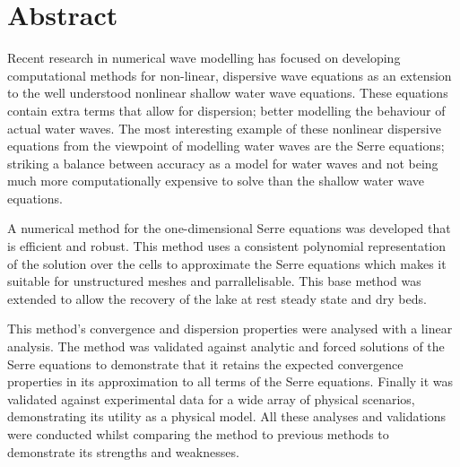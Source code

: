 \chapter*{Abstract}\label{abstract}


Recent research in numerical wave modelling has focused on developing computational methods for non-linear, dispersive wave equations as an extension to the well understood nonlinear shallow water wave equations. These equations contain extra terms that allow for dispersion; better modelling the behaviour of actual water waves. The most interesting example of these nonlinear dispersive equations from the viewpoint of modelling water waves are the Serre equations; striking a balance between accuracy as a model for water waves and not being much more computationally expensive to solve than the shallow water wave equations. 

A numerical method for the one-dimensional Serre equations was developed that is efficient and robust. This method uses a consistent polynomial representation of the solution over the cells to approximate the Serre equations which makes it suitable for unstructured meshes and parrallelisable. This base method was extended to allow the recovery of the lake at rest steady state and dry beds.  

This method's convergence and dispersion properties were analysed with a linear analysis. The method was validated against analytic and forced solutions of the Serre equations to demonstrate that it retains the expected convergence properties in its approximation to all terms of the Serre equations. Finally it was validated against experimental data for a wide array of physical scenarios, demonstrating its utility as a physical model. All these analyses and validations were conducted whilst comparing the method to previous methods to demonstrate its strengths and weaknesses. 


